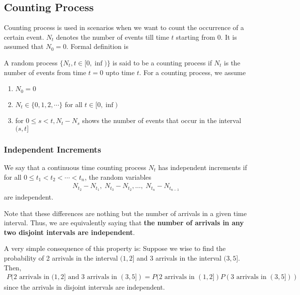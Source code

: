 \documentclass[../../probability-notes.tex]{subfiles}
\begin{document}
    \subsection{Counting Process}
    Counting process is used in scenarios when we want to count the occurrence of a certain event. $N_{t}$ denotes the number of events till time $t$ starting from 0. It is assumed that $N_{0} = 0$. Formal definition is\newline

    A random process $\{N_{t}, t \in [0, \inf)\}$ is said to be a counting process if $N_{t}$ is the number of events from time $t=0$ upto time $t$. For a counting process, we assume
    \begin{enumerate}
        \item $N_{0} = 0$
        \item $N_{t} \in \{0, 1, 2, \cdots\}$ for all $t \in [0, \inf)$
        \item for $0 \leq s < t, N_{t} - N_{s} $ shows the number of events that occur in the interval $(s,t]$ 
    \end{enumerate}

    \subsubsection{Independent Increments}
    We say that a continuous time counting process $N_{t}$ has independent increments if for all $0 \leq t_{1} < t_{2} < \cdots < t_{n}$, the random variables
    \begin{align*}
         N_{t_{2}} - N_{t_{1}}, \;N_{t_{3}} - N_{t_{2}}, \ldots, \;N_{t_{n}} - N_{t_{n-1}}
    \end{align*}
    are independent.\newline

    Note that these differences are nothing but the number of arrivals in a given time interval. Thus, we are equivalently saying that \textbf{the number of arrivals in any two disjoint intervals are independent}.\newline

    A very simple consequence of this property is:\newline
    Suppose we wise to find the probability of 2 arrivals in the interval $(1,2]$ and 3 arrivals in the interval $(3,5]$. Then,
    \begin{align*}
        P(2 \text{ arrivals in } (1,2] \text{ and } 3 \text{ arrivals in } (3,5]) = P(2 \text{ arrivals in } (1,2]) P(3 \text{ arrivals in } (3,5]))
    \end{align*}
    since the arrivals in disjoint intervals are independent.
\end{document}
